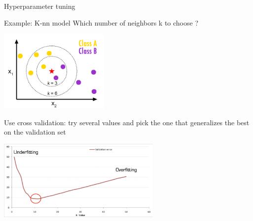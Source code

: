 \begin{frame}[allowframebreaks]{Hyperparameter tuning}

Example: K-nn model
Which number of neighbors k to choose ?
\begin{center}
  \includegraphics[width=0.4\textwidth]{images/model_selection_knn_1.png}
\end{center}
Use cross validation: try several values and pick the one that generalizes the best on the validation set
\begin{center}
  \includegraphics[width=0.6\textwidth]{images/model_selection_knn.png}
\end{center}
\end{frame}

